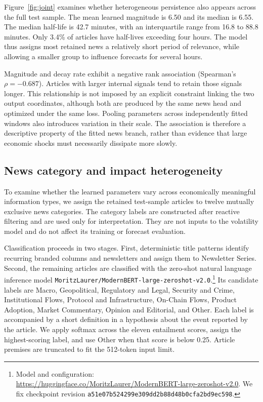 Figure~\ref{fig:joint} examines whether heterogeneous persistence also
appears across the full test sample. The mean learned magnitude is 6.50
and its median is 6.55. The median half-life is 42.7 minutes, with an
interquartile range from 16.8 to 88.8 minutes. Only 3.4\% of articles
have half-lives exceeding four hours. The model thus assigns most
retained news a relatively short period of relevance, while allowing a
smaller group to influence forecasts for several hours.

Magnitude and decay rate exhibit a negative rank association
(Spearman's $\rho=-0.687$). Articles with larger internal signals tend to
retain those signals longer. This relationship is not imposed by an
explicit constraint linking the two output coordinates, although both
are produced by the same news head and optimized under the same loss.
Pooling parameters across independently fitted windows also introduces
variation in their scale. The association is therefore a descriptive
property of the fitted news branch, rather than evidence that large
economic shocks must necessarily dissipate more slowly.

\subsection{News category and impact heterogeneity}
\label{sec:categories}

To examine whether the learned parameters vary across economically
meaningful information types, we assign the retained test-sample
articles to twelve mutually exclusive news categories. The category
labels are constructed after reactive filtering and are used only for
interpretation. They are not inputs to the volatility model and do not
affect its training or forecast evaluation.

Classification proceeds in two stages. First, deterministic title
patterns identify recurring branded columns and newsletters and assign
them to Newsletter Series. Second, the remaining articles are classified
with the zero-shot natural language inference model
\texttt{MoritzLaurer/\allowbreak ModernBERT-large-zeroshot-v2.0}.\footnote{Model and
configuration: \url{https://huggingface.co/MoritzLaurer/ModernBERT-large-zeroshot-v2.0}.
We fix checkpoint revision
\texttt{a51e07b524299e309dd2b88d48b0cfa2bd9ec598}.}
Its candidate labels are Macro, Geopolitical, Regulatory and Legal,
Security and Crime, Institutional Flows, Protocol and Infrastructure,
On-Chain Flows, Product Adoption, Market Commentary, Opinion and
Editorial, and Other. Each label is accompanied by a short definition
in a hypothesis about the event reported by the article. We apply
softmax across the eleven entailment scores, assign the highest-scoring
label, and use Other when that score is below 0.25. Article premises are
truncated to fit the 512-token input limit.

